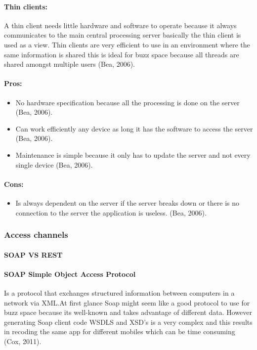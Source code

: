 \paragraph{Thin clients:}
\begin{description}
\item \hspace{4ex}
A thin client needs little hardware and software to operate because it always communicates to the main central processing server basically the thin client is used as a view. Thin clients are very efficient to use in an environment where the same information is shared this is ideal for buzz space because all threads are shared amongst multiple users (Bea, 2006).
\end{description}
\paragraph{Pros: } 
 \begin{itemize}	
		\item No hardware specification because all the processing is done on the server (Bea, 2006).
		\item Can work efficiently any device as long it has the software to access the server (Bea, 2006).
		\item Maintenance is simple because it only has to update the server and not every single device (Bea, 2006).
	\end{itemize}
\paragraph{Cons: } 
 \begin{itemize}	
		\item Is always dependent on the server if the server breaks down or there is no connection to the server the application is useless. (Bea, 2006).
	\end{itemize}


\subsubsection{Access channels}
\paragraph{SOAP VS REST}
\paragraph{SOAP Simple Object Access Protocol}
\begin{description}
\item \hspace{4ex} 
Is a protocol that exchanges structured information between computers in a network via XML.At first glance Soap might seem like a good protocol to use for buzz space because its well-known and takes advantage of different data. However generating Soap client code WSDLS and XSD’s is a very complex and this results in recoding the same app for different mobiles  which can be time consuming  (Cox, 2011).
\end{description}


